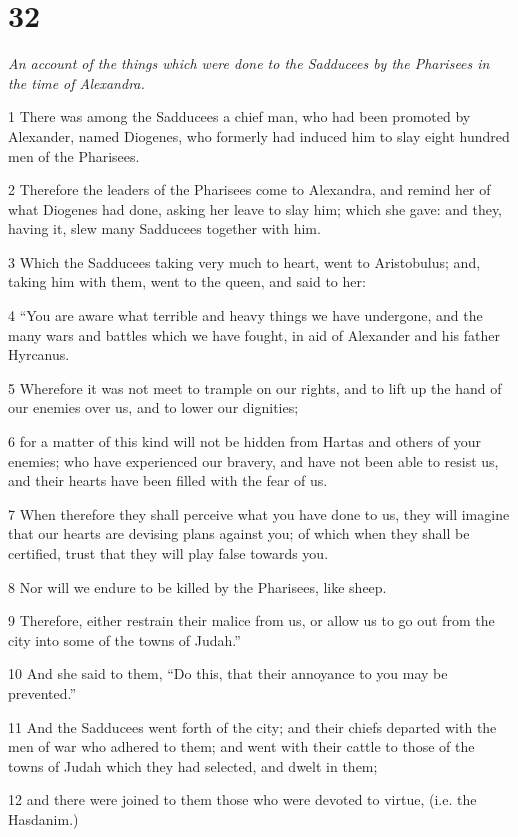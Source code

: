 \chapter{32}

\par \textit{An account of the things which were done to the Sadducees by the Pharisees in the time of Alexandra.}

1 There was among the Sadducees a chief man, who had been promoted by Alexander, named Diogenes, who formerly had induced him to slay eight hundred men of the Pharisees. 

2 Therefore the leaders of the Pharisees come to Alexandra, and remind her of what Diogenes had done, asking her leave to slay him; which she gave: and they, having it, slew many Sadducees together with him. 

3 Which the Sadducees taking very much to heart, went to Aristobulus; and, taking him with them, went to the queen, and said to her: 

4 “You are aware what terrible and heavy things we have undergone, and the many wars and battles which we have fought, in aid of Alexander and his father Hyrcanus. 

5 Wherefore it was not meet to trample on our rights, and to lift up the hand of our enemies over us, and to lower our dignities; 

6 for a matter of this kind will not be hidden from Hartas and others of your enemies; who have experienced our bravery, and have not been able to resist us, and their hearts have been filled with the fear of us. 

7 When therefore they shall perceive what you have done to us, they will imagine that our hearts are devising plans against you; of which when they shall be certified, trust that they will play false towards you. 

8 Nor will we endure to be killed by the Pharisees, like sheep. 

9 Therefore, either restrain their malice from us, or allow us to go out from the city into some of the towns of Judah.” 

10 And she said to them, “Do this, that their annoyance to you may be prevented.” 

11 And the Sadducees went forth of the city; and their chiefs departed with the men of war who adhered to them; and went with their cattle to those of the towns of Judah which they had selected, and dwelt in them; 

12 and there were joined to them those who were devoted to virtue, (i.e. the Hasdanim.) 

